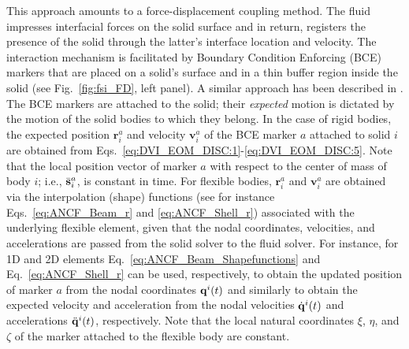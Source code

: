 This approach amounts to a force-displacement coupling method. The fluid impresses interfacial forces on the solid surface and in return, registers the presence of the solid through the latter's interface location and velocity. The interaction mechanism is facilitated by Boundary Condition Enforcing (BCE) markers that are placed on a solid's surface and in a thin buffer region inside the solid (see Fig.~\ref{fig:fsi_FD}, left panel). A similar approach has been described in \cite{fourey2010,armanCompFluids2015,Hu2013}. The BCE markers are attached to the solid; their \textit{expected} motion is dictated by the motion of the solid bodies to which they belong. In the case of rigid bodies, the expected position $\mathbf{r}_i^a$ and velocity $\mathbf{v}_i^a$ of the BCE marker $a$ attached to solid $i$ are obtained from Eqs.~\ref{eq:DVI_EOM_DISC:1}-\ref{eq:DVI_EOM_DISC:5}. Note that the local position vector of marker $a$ with respect to the center of mass of body $i$; i.e., ${\bar {\bf s}}^{a}_i $, is constant in time. For flexible bodies, $\mathbf{r}_i^a$ and $\mathbf{v}_i^a$ are obtained via the interpolation (shape) functions (see for instance Eqs.~\ref{eq:ANCF_Beam_r} and \ref{eq:ANCF_Shell_r}) associated with the underlying flexible element, given that the nodal coordinates, velocities, and accelerations are passed from the solid solver to the fluid solver. For instance, for 1D and 2D elements Eq.~\ref{eq:ANCF_Beam_Shapefunctions} and Eq.~\ref{eq:ANCF_Shell_r} can be used, respectively, to obtain the updated position of marker $a$ from the nodal coordinates $ {{\mathbf{q}}}^{i}(t)$ and similarly to obtain the expected velocity and acceleration from the nodal velocities  ${\dot{\mathbf{q}}}^{i}(t)$ and accelerations $\ddot{\mathbf{q}}^{i}(t)$, respectively. Note that the local natural coordinates $\xi$, $\eta$, and $\zeta$ of the marker attached to the flexible body are constant.

